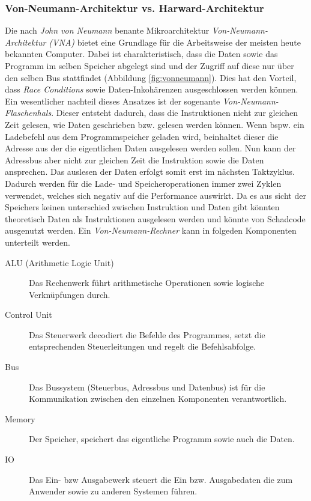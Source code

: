         \subsubsection{Von-Neumann-Architektur vs. Harward-Architektur}
            Die nach \textit{John von Neumann} benante Mikroarchitektur \textit{Von-Neumann-Architektur (VNA)}
            bietet eine Grundlage für die Arbeitsweise der meisten heute bekannten Computer.
            Dabei ist charakteristisch, dass die Daten sowie das Programm im selben Speicher abgelegt sind und
            der Zugriff auf diese nur über den selben Bus stattfindet (Abbildung \ref{fig:vonneumann}).
            Dies hat den Vorteil, dass \textit{Race Conditions} sowie Daten-Inkohärenzen ausgeschlossen werden können.
            Ein wesentlicher nachteil dieses Ansatzes ist der sogenante \textit{Von-Neumann-Flaschenhals}.
            Dieser entsteht dadurch, dass die Instruktionen nicht zur gleichen Zeit gelesen,
            wie Daten geschrieben bzw. gelesen werden können. Wenn bspw. ein Ladebefehl aus dem Programmspeicher
            geladen wird, beinhaltet dieser die Adresse aus der die eigentlichen Daten ausgelesen werden sollen.
            Nun kann der Adressbus aber nicht zur gleichen Zeit die Instruktion sowie die Daten ansprechen.
            Das auslesen der Daten erfolgt somit erst im nächsten Taktzyklus. Dadurch werden für
            die Lade- und Speicheroperationen immer zwei Zyklen verwendet, welches sich
            negativ auf die Performance auswirkt.
            Da es aus sicht der Speichers keinen unterschied zwischen Instruktion und Daten gibt
            könnten theoretisch Daten als Instruktionen ausgelesen werden und könnte von Schadcode ausgenutzt werden.
            Ein \textit{Von-Neumann-Rechner} kann in folgeden Komponenten unterteilt werden.

            \begin{description}
                \item[ALU (Arithmetic Logic Unit)] Das Rechenwerk führt arithmetische Operationen sowie logische Verknüpfungen durch. 
                \item[Control Unit] Das Steuerwerk decodiert die Befehle des Programmes,
                setzt die entsprechenden Steuerleitungen und regelt die Befehlsabfolge.
                \item[Bus] Das Bussystem (Steuerbus, Adressbus und Datenbus) ist für die Kommunikation zwischen den einzelnen
                Komponenten verantwortlich.
                \item[Memory] Der Speicher, speichert das eigentliche Programm sowie auch die Daten.
                \item[IO] Das Ein- bzw Ausgabewerk steuert die Ein bzw. Ausgabedaten die zum Anwender sowie zu anderen Systemen führen.
            \end{description}

